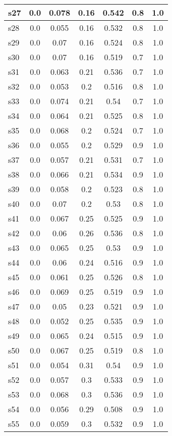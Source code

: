 \documentclass{article}
\begin{document}
\begin{tabular}{|l|c|c|c|c|c|c|}
\hline
s27 &0.0 & 0.078 & 0.16 & 0.542 & 0.8 & 1.0\\
\hline
s28 &0.0 & 0.055 & 0.16 & 0.532 & 0.8 & 1.0\\
\hline
s29 &0.0 & 0.07 & 0.16 & 0.524 & 0.8 & 1.0\\
\hline
s30 &0.0 & 0.07 & 0.16 & 0.519 & 0.7 & 1.0\\
\hline
s31 &0.0 & 0.063 & 0.21 & 0.536 & 0.7 & 1.0\\
\hline
s32 &0.0 & 0.053 & 0.2 & 0.516 & 0.8 & 1.0\\
\hline
s33 &0.0 & 0.074 & 0.21 & 0.54 & 0.7 & 1.0\\
\hline
s34 &0.0 & 0.064 & 0.21 & 0.525 & 0.8 & 1.0\\
\hline
s35 &0.0 & 0.068 & 0.2 & 0.524 & 0.7 & 1.0\\
\hline
s36 &0.0 & 0.055 & 0.2 & 0.529 & 0.9 & 1.0\\
\hline
s37 &0.0 & 0.057 & 0.21 & 0.531 & 0.7 & 1.0\\
\hline
s38 &0.0 & 0.066 & 0.21 & 0.534 & 0.9 & 1.0\\
\hline
s39 &0.0 & 0.058 & 0.2 & 0.523 & 0.8 & 1.0\\
\hline
s40 &0.0 & 0.07 & 0.2 & 0.53 & 0.8 & 1.0\\
\hline
s41 &0.0 & 0.067 & 0.25 & 0.525 & 0.9 & 1.0\\
\hline
s42 &0.0 & 0.06 & 0.26 & 0.536 & 0.8 & 1.0\\
\hline
s43 &0.0 & 0.065 & 0.25 & 0.53 & 0.9 & 1.0\\
\hline
s44 &0.0 & 0.06 & 0.24 & 0.516 & 0.9 & 1.0\\
\hline
s45 &0.0 & 0.061 & 0.25 & 0.526 & 0.8 & 1.0\\
\hline
s46 &0.0 & 0.069 & 0.25 & 0.519 & 0.9 & 1.0\\
\hline
s47 &0.0 & 0.05 & 0.23 & 0.521 & 0.9 & 1.0\\
\hline
s48 &0.0 & 0.052 & 0.25 & 0.535 & 0.9 & 1.0\\
\hline
s49 &0.0 & 0.065 & 0.24 & 0.515 & 0.9 & 1.0\\
\hline
s50 &0.0 & 0.067 & 0.25 & 0.519 & 0.8 & 1.0\\
\hline
s51 &0.0 & 0.054 & 0.31 & 0.54 & 0.9 & 1.0\\
\hline
s52 &0.0 & 0.057 & 0.3 & 0.533 & 0.9 & 1.0\\
\hline
s53 &0.0 & 0.068 & 0.3 & 0.536 & 0.9 & 1.0\\
\hline
s54 &0.0 & 0.056 & 0.29 & 0.508 & 0.9 & 1.0\\
\hline
s55 &0.0 & 0.059 & 0.3 & 0.532 & 0.9 & 1.0\\

\end{tabular}
\end{document}
